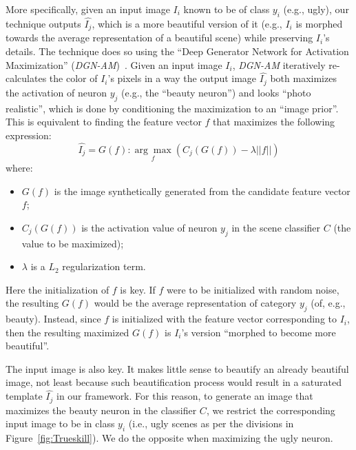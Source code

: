 More specifically, given an input image $I_i$ known to be of class $y_i$  (e.g., ugly), our technique outputs  $\hat{I_j}$, which is a more beautiful version of it (e.g., $I_i$ is morphed  towards the average representation of a beautiful scene) while preserving $I_i$'s details. The technique does so using the ``Deep Generator Network for Activation Maximization'' (\emph{DGN-AM})~\cite{nguyen2016synthesizing}. Given an input image $I_i$, \emph{DGN-AM} iteratively re-calculates the color of $I_i$'s pixels in  a way  the output image $\hat{I_j}$  both maximizes  the  activation of neuron $y_j$ (e.g., the ``beauty neuron'') and looks ``photo realistic'',  which is done by conditioning the maximization to an ``image prior''. This is equivalent to finding the feature vector $f$ that maximizes the following expression:
\begin{equation}
\hat{I_j} =G( f ) : \underset{f}{\arg\max}(C_{j}(G(f))-\lambda||f||)
\end{equation}
where:
\begin{itemize}
    \item $G(f)$ is the image synthetically generated from the candidate feature vector $f$;
    \item $C_j(G(f))$ is the activation value of neuron $y_j$ in the scene classifier $C$ (the value to be maximized);
    \item $\lambda$ is a $L_2$ regularization term.
\end{itemize}
Here the initialization of $f$ is key. If $f$ were to be initialized with random noise, the resulting $G(f)$ would be the average representation of category $y_j$ (of, e.g., beauty). Instead, since $f$ is initialized with the feature vector corresponding to $I_i$, then the resulting maximized $G(f)$ is $I_i$'s version ``morphed to become more beautiful''.

The input image is also key. It makes little sense to beautify an already beautiful image, not least because such beautification process would result in a saturated template $\hat{I_j}$ in our framework. For this reason, to generate an image that maximizes the beauty neuron in the classifier $C$, we restrict the  corresponding input image to be in class $y_i$ (i.e., ugly scenes as per the divisions in Figure~\ref{fig:Trueskill}). We do the opposite when maximizing the ugly neuron. 




